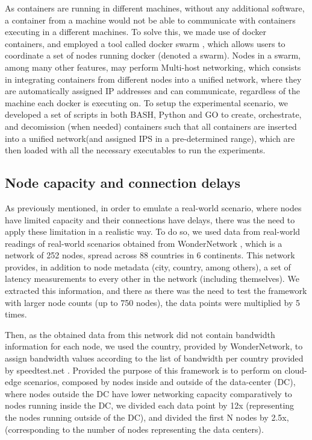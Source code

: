 As containers are running in different machines, without any additional software, a container from a machine would not be able to communicate with containers executing in a different machines. To solve this,  we made use of docker containers, and employed a tool called docker swarm , which allows users to coordinate a set of nodes running docker (denoted a swarm). Nodes in a swarm, among many other features, may perform Multi-host networking, which consists in integrating containers from different nodes into a unified network, where they are automatically assigned IP addresses and can communicate, regardless of the machine each docker is executing on. To setup the experimental scenario, we developed a set of scripts in both BASH, Python and GO to create, orchestrate, and decomission (when needed) containers such that all containers are inserted into a unified network(and assigned IPS in a pre-determined range), which are then loaded with all the necessary executables to run the experiments.

\subsection{Node capacity and connection delays}

As previously mentioned, in order to emulate a real-world scenario, where nodes have limited capacity and their connections have delays, there was the need to apply these limitation in a realistic way. To do so, we used data from real-world readings of real-world scenarios obtained from WonderNetwork , which is a network of 252 nodes, spread across 88 countries in 6 continents. This network provides, in addition to node metadata (city, country, among others), a set of latency measurements to every other in the network (including themselves). We extracted this information, and there as there was the need to test the framework with larger node counts (up to 750 nodes), the data points were multiplied by 5 times. 

Then, as the obtained data from this network did not contain bandwidth information for each node, we used the country, provided by WonderNetwork, to assign bandwidth values according to the list of bandwidth per country provided by speedtest.net \cite{speedtest_global_index}. Provided the purpose of this framework is to perform on cloud-edge scenarios, composed by nodes inside and outside of the data-center (DC), where nodes outside the DC have lower networking capacity comparatively to nodes running inside the DC, we divided each data point by 12x (representing the nodes running outside of the DC), and divided the first N nodes by 2.5x, (corresponding to the number of nodes representing the data centers).

